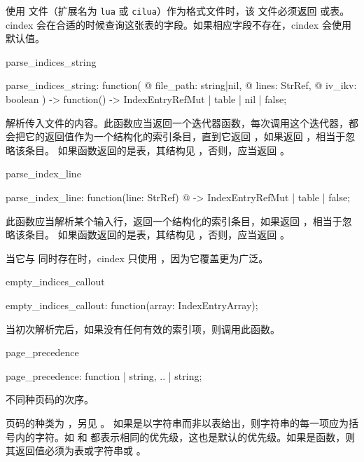 \documentclass[class=article,doc={kv-usage}]{cusdoc}
\newcommand*\LUA{\texorpdfstring{\textcon{lua}}{lua}}
\begin{document}
使用 \LUA 文件（扩展名为 \texttt{lua} 或 \texttt{cilua}）作为格式文件时，该 \LUA 文件必须返回  或表。cindex 会在合适的时候查询这张表的字段。如果相应字段不存在，cindex 会使用默认值。

\begin{luadoc}{parse_indices_string}
  \begin{luasyntax}
    parse_indices_string: function(
   @  file_path: string|nil,
   @  lines: StrRef,
   @  iv_ikv: boolean
    ) -> function() -> IndexEntryRefMut | table | nil | false;
  \end{luasyntax}
解析传入文件的内容。此函数应当返回一个迭代器函数，每次调用这个迭代器，都会把它的返回值作为一个结构化的索引条目，直到它返回 ，如果返回 ，相当于忽略该条目。
如果函数返回的是表，其结构见 ，否则，应当返回 。
\end{luadoc}

\begin{luadoc}{parse_index_line}
  \begin{luasyntax}
    parse_index_line: function(line: StrRef)
   @                -> IndexEntryRefMut | table | false;
  \end{luasyntax}
此函数应当解析某个输入行，返回一个结构化的索引条目，如果返回 ，相当于忽略该条目。
如果函数返回的是表，其结构见 ，否则，应当返回 。

当它与  同时存在时，cindex 只使用 ，因为它覆盖更为广泛。
\end{luadoc}

\begin{luadoc}{empty_indices_callout}
  \begin{luasyntax}
    empty_indices_callout: function(array: IndexEntryArray);
  \end{luasyntax}
当初次解析完后，如果没有任何有效的索引项，则调用此函数。
\end{luadoc}

\begin{luadoc}{page_precedence}
  \begin{luasyntax}
    page_precedence: function | { string, .. } | string;
  \end{luasyntax}
不同种页码的次序。

页码的种类为 ，另见 。
如果是以字符串而非以表给出，则字符串的每一项应为括号内的字符。如  和  都表示相同的优先级，这也是默认的优先级。如果是函数，则其返回值必须为表或字符串或 。
\end{luadoc}
\end{document}

